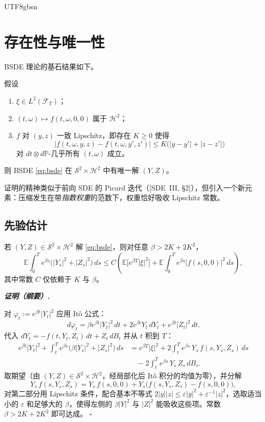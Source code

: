 \documentclass{article}
\newenvironment{proof}[1][证明]{%
  \par\smallskip\noindent\textit{\textbf{#1.}}\quad\ignorespaces
}{%
  \hfill$\square$\par\smallskip
}
\theoremstyle{plain}
\theoremstyle{definition}
\theoremstyle{remark}
\newcommand{\E}{\mathbb{E}}
\newcommand{\Prob}{\mathbb{P}}
\newcommand{\F}{\mathcal{F}}
\newcommand{\Sc}{\mathcal{S}}
\newcommand{\Hc}{\mathcal{H}}
\begin{document}
\begin{CJK*}{UTF8}{gbsn}
\section{存在性与唯一性}

BSDE 理论的基石结果如下。

\begin{theorem}\label{thm:pp}
假设
\begin{enumerate}
  \item[(i)] $\xi \in L^2(\F_T)$；
  \item[(ii)] $(t, \omega) \mapsto f(t, \omega, 0, 0)$ 属于 $\Hc^2$；
  \item[(iii)] $f$ 对 $(y, z)$ 一致 Lipschitz，即存在 $K \ge 0$ 使得
    \[
      |f(t, \omega, y, z) - f(t, \omega, y', z')| \le K\big(|y - y'| + |z - z'|\big)
    \]
    对 $dt \otimes d\Prob$-几乎所有 $(t,\omega)$ 成立。
\end{enumerate}
则 BSDE \eqref{eq:bsde} 在 $\Sc^2 \times \Hc^2$ 中有唯一解 $(Y, Z)$。
\end{theorem}

证明的精神类似于前向 SDE 的 Picard 迭代（[SDE~III, \S2]），但引入一个新元素：压缩发生在带\emph{指数权重}的范数下，权重恰好吸收 Lipschitz 常数。

\subsection{先验估计}

\begin{lemma}[先验界]\label{lem:apriori}
若 $(Y, Z) \in \Sc^2 \times \Hc^2$ 解 \eqref{eq:bsde}，则对任意 $\beta > 2K + 2K^2$，
\[
  \E\!\int_0^T e^{\beta s}\big(|Y_s|^2 + |Z_s|^2\big)\,ds \le C \!\left( \E\big[ e^{\beta T}|\xi|^2 \big] + \E\!\int_0^T e^{\beta s}|f(s, 0, 0)|^2\, ds \right),
\]
其中常数 $C$ 仅依赖于 $K$ 与 $\beta$。
\end{lemma}

\begin{proof}[证明（纲要）]
对 $\varphi_t := e^{\beta t} |Y_t|^2$ 应用 It\^o 公式：
\[
  d\varphi_t = \beta e^{\beta t}|Y_t|^2\,dt + 2 e^{\beta t} Y_t\,dY_t + e^{\beta t} |Z_t|^2\,dt.
\]
代入 $dY_t = -f(t, Y_t, Z_t)\,dt + Z_t\,dB_t$ 并从 $t$ 积到 $T$：
\begin{align*}
  e^{\beta t}|Y_t|^2 + \int_t^T e^{\beta s}\big(\beta |Y_s|^2 + |Z_s|^2\big)\,ds
  &= e^{\beta T}|\xi|^2 + 2\int_t^T e^{\beta s}\, Y_s\, f(s, Y_s, Z_s)\,ds \\
  &\quad - 2\int_t^T e^{\beta s}\, Y_s\, Z_s\, dB_s.
\end{align*}
取期望（由 $(Y, Z) \in \Sc^2 \times \Hc^2$，经局部化后 It\^o 积分的均值为零），并分解
\[
  Y_s\, f(s, Y_s, Z_s) = Y_s\, f(s, 0, 0) + Y_s\big(f(s, Y_s, Z_s) - f(s, 0, 0)\big),
\]
对第二部分用 Lipschitz 条件，配合基本不等式 $2|y||z| \le \varepsilon|y|^2 + \varepsilon^{-1}|z|^2$，选取适当小的 $\varepsilon$ 和足够大的 $\beta$，使得左侧的 $\beta|Y|^2$ 与 $|Z|^2$ 能吸收这些项。常数 $\beta > 2K + 2K^2$ 即可达成。
\end{proof}


\end{CJK*}
\end{document}
